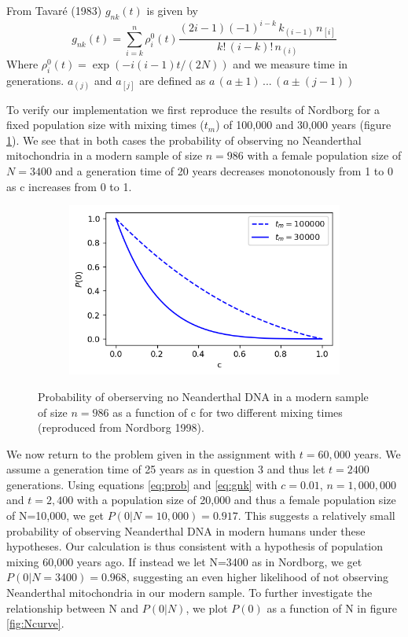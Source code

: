 \documentclass{article}
\begin{document}
From Tavaré (1983) $g_{nk}(t)$ is given by
\begin{equation}\label{eq:gnk}
g_{nk}(t) = \sum_{i = k}^n{\rho_i^0(t) \dfrac{(2i-1)(-1)^{i-k} \, k_{(i-1)} \, n_{[i]}}{k! \, (i-k)! \, n_{(i)}}}
\end{equation}
Where $\rho_i^0(t) = \exp{(-i(i-1)t/(2N))}$ and we measure time in generations. $a_{(j)}$ and $a_{[j]}$ are defined as $a \, (a \pm 1) \, ... \, (a \pm (j-1) )$

To verify our implementation we first reproduce the results of Nordborg for a fixed population size with mixing times ($t_m$) of 100,000 and 30,000 years (figure \ref{fig:nordborg}). We see that in both cases the probability of observing no Neanderthal mitochondria in a modern sample of size $n=986$ with a female population size of $N = 3400$ and a generation time of 20 years decreases monotonously from 1 to 0 as c increases from 0 to 1.

\begin{figure}[h]
	\centering
	\begin{subfigure}[t]{0.45\linewidth}
		\centering
		\includegraphics[width = 1.0\linewidth, trim={0 0 0 0}, clip=true]{figures/nordborg_curve.png}
	\end{subfigure}
\caption{Probability of oberserving no Neanderthal DNA in a modern sample of size $n=986$ as a function of c for two different mixing times (reproduced from Nordborg 1998).}
\label{fig:nordborg}
\end{figure}


We now return to the problem given in the assignment with $t=60,000$ years. We assume a generation time of 25 years as in question 3 and thus let $t = 2400$ generations.
Using equations \ref{eq:prob} and \ref{eq:gnk} with $c=0.01$, $n=1,000,000$ and $t=2,400$ with a population size of 20,000 and thus a female population size of N=10,000, we get $P(0|N=10,000) = 0.917$. This suggests a relatively small probability of observing Neanderthal DNA in modern humans under these hypotheses. Our calculation is thus consistent with a hypothesis of population mixing 60,000 years ago. If instead we let N=3400 as in Nordborg, we get $P(0|N=3400) = 0.968$, suggesting an even higher likelihood of not observing Neanderthal mitochondria in our modern sample.  To further investigate the relationship between N and $P(0|N)$, we plot $P(0)$ as a function of N in figure \ref{fig:Ncurve}.
\end{document}
